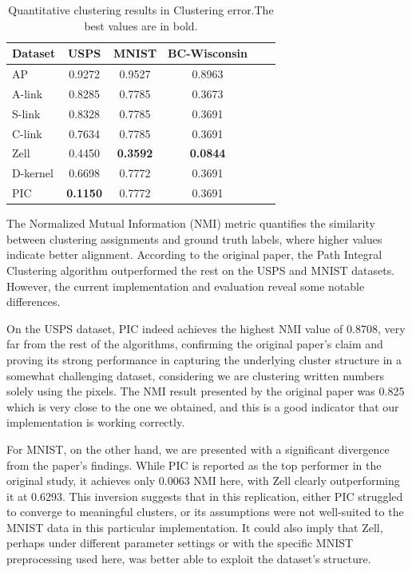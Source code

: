\documentclass[
	10pt,
	parskip=half-,	
	paper=a4,
	english
	]{scrartcl}
\begin{document}
\begin{table}[h]
    \centering
    \caption{Quantitative clustering results in Clustering error.The best values are in bold.}
    \begin{tabular}{lccccc}
    \toprule
    \textbf{Dataset} & \textbf{USPS} & \textbf{MNIST} & \textbf{BC-Wisconsin} \\
    \midrule
    AP       & 0.9272   & 0.9527 & 0.8963\\
    A-link   & 0.8285  & 0.7785 & 0.3673  \\
    S-link   & 0.8328   & 0.7785 & 0.3691\\
    C-link   & 0.7634   & 0.7785 & 0.3691\\
    Zell     & 0.4450   & \textbf{0.3592} & \textbf{0.0844}\\
    D-kernel & 0.6698   & 0.7772 & 0.3691\\
    PIC & \textbf{0.1150} & 0.7772 & 0.3691 \\
    \bottomrule
    \end{tabular}
\end{table}

The Normalized Mutual Information (NMI) metric quantifies the similarity between clustering assignments and ground truth labels, where higher values indicate better alignment. According to the original paper, the Path Integral Clustering algorithm outperformed the rest on the USPS and MNIST datasets. However, the current implementation and evaluation reveal some notable differences.

On the USPS dataset, PIC indeed achieves the highest NMI value of 0.8708, very far from the rest of the algorithms, confirming the original paper's claim and proving its strong performance in capturing the underlying cluster structure in a somewhat challenging dataset, considering we are clustering written numbers solely using the pixels. The NMI result presented by the original paper was 0.825 which is very close to the one we obtained, and this is a good indicator that our implementation is working correctly.

For MNIST, on the other hand, we are presented with a significant divergence from the paper's findings. While PIC is reported as the top performer in the original study, it achieves only 0.0063 NMI here, with Zell clearly outperforming it at 0.6293. This inversion suggests that in this replication, either PIC struggled to converge to meaningful clusters, or its assumptions were not well-suited to the MNIST data in this particular implementation. It could also imply that Zell, perhaps under different parameter settings or with the specific MNIST preprocessing used here, was better able to exploit the dataset's structure.
\end{document}
